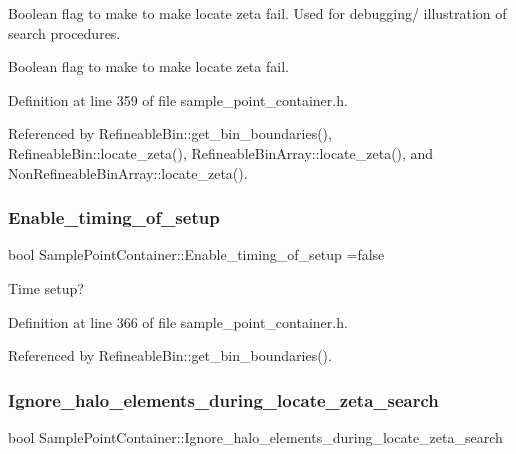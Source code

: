 Boolean flag to make to make locate zeta fail. Used for debugging/ illustration of search procedures. 

Boolean flag to make to make locate zeta fail. 

Definition at line 359 of file sample\+\_\+point\+\_\+container.\+h.



Referenced by Refineable\+Bin\+::get\+\_\+bin\+\_\+boundaries(), Refineable\+Bin\+::locate\+\_\+zeta(), Refineable\+Bin\+Array\+::locate\+\_\+zeta(), and Non\+Refineable\+Bin\+Array\+::locate\+\_\+zeta().

\mbox{\label{classSamplePointContainer_a1755d4419776cc87ab27e845d03449de}} 
\subsubsection{\texorpdfstring{Enable\+\_\+timing\+\_\+of\+\_\+setup}{Enable\_timing\_of\_setup}}
{\footnotesize\ttfamily bool Sample\+Point\+Container\+::\+Enable\+\_\+timing\+\_\+of\+\_\+setup =false\hspace{0.3cm}{\ttfamily [static]}}



Time setup? 



Definition at line 366 of file sample\+\_\+point\+\_\+container.\+h.



Referenced by Refineable\+Bin\+::get\+\_\+bin\+\_\+boundaries().

\mbox{\label{classSamplePointContainer_a5b1f32943385600039df3a76b13a216b}} 
\subsubsection{\texorpdfstring{Ignore\+\_\+halo\+\_\+elements\+\_\+during\+\_\+locate\+\_\+zeta\+\_\+search}{Ignore\_halo\_elements\_during\_locate\_zeta\_search}}
{\footnotesize\ttfamily bool Sample\+Point\+Container\+::\+Ignore\+\_\+halo\+\_\+elements\+\_\+during\+\_\+locate\+\_\+zeta\+\_\+search\hspace{0.3cm}{\ttfamily [protected]}}



